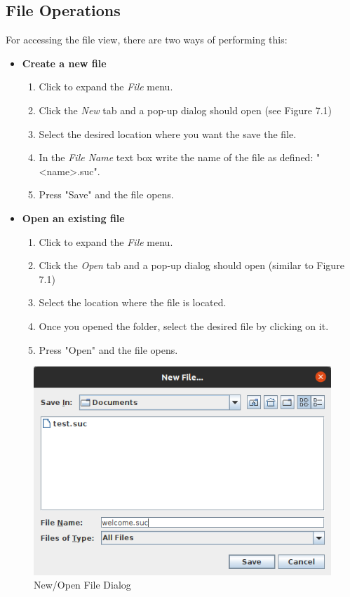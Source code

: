 \documentclass[12pt,a4paper,twoside]{report}
\begin{document}
\subsection{File Operations}
For accessing the file view, there are two ways of performing this:
\begin{itemize}
	\item \textbf{Create a new file}
	\begin{enumerate}
	\item Click to expand the \textit{File} menu.
	\item Click the \textit{New} tab and a pop-up dialog should open (see Figure 7.1)
	
	\item Select the desired location where you want the save the file.
	\item In the \textit{File Name} text box write the name of the file as defined: "<name>.suc".
	\item Press "Save" and the file opens.
	\end{enumerate}
	\item \textbf{Open an existing file}
	\begin{enumerate}
	\item Click to expand the \textit{File} menu.
	\item Click the \textit{Open} tab and a pop-up dialog should open (similar to Figure 7.1)
	\item Select the location where the file is located.
	\item Once you opened the folder, select the desired file by clicking on it.
	\item Press "Open" and the file opens.
	\end{enumerate}
\end{itemize}
\begin{figure}[H]
	\centering
	\includegraphics[width=0.7\linewidth]{img/userGuide/NewFileDialog.png}
	\caption{New/Open File Dialog}
	\label{fig:conf}
	\end{figure}
\end{document}

